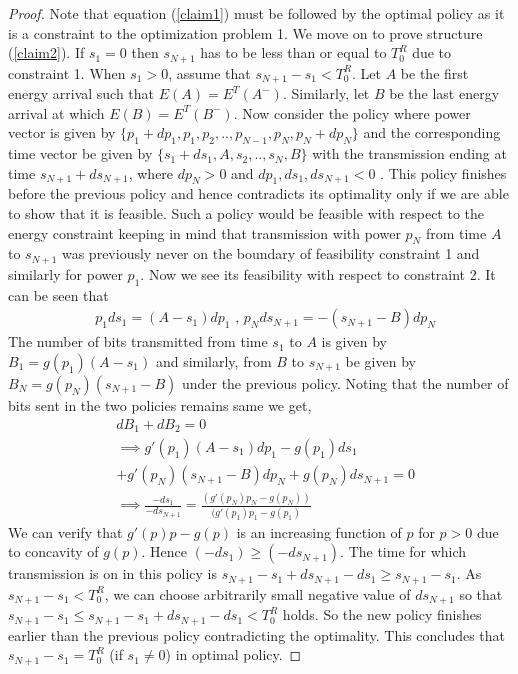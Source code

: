 \begin{proof}
Note that equation (\ref{claim1}) must be followed by the optimal policy as it is a constraint to the optimization problem 1. We move on to prove structure (\ref{claim2}). If $s_1=0$ then $s_{N+1}$ has to be less than or equal to $T^R_0$ due to constraint 1. When $s_1>0$, assume that $s_{N+1}-s_1<T^R_0$. Let $A$ be the first energy arrival such that $E(A)=E^T(A^-)$. Similarly, let $B$ be the last energy arrival at which $E(B)=E^T(B^-)$. Now consider the policy where power vector is given by $\{p_1+dp_1,p_1,p_2,..,p_{N-1},p_N,p_N+dp_N \}$ and the corresponding time vector be given by $\{s_1+ds_1,A,s_2,..,s_{N},B\}$ with the transmission ending at time $s_{N+1}+ds_{N+1}$, where $dp_N>0$ and  $dp_1,ds_1, ds_{N+1}<0$ . This policy finishes before the previous policy and hence contradicts its optimality only if we are able to show that it is feasible. Such a policy would be feasible with respect to the energy constraint keeping in mind that transmission with power $p_N$ from time $A$ to $s_{N+1}$ was previously never on the boundary of feasibility constraint 1 and similarly for power $p_1$. Now we see its feasibility with respect to constraint 2. It can be seen that
\begin{align}
&p_1ds_1=(A-s_1)dp_1\text{ , }p_Nds_{N+1}=-(s_{N+1}-B)dp_N
\end{align}
The number of bits transmitted from time $s_1$ to $A$ is given by $B_1=g(p_1)(A-s_1)$ and similarly, from $B$ to $s_{N+1}$ be given by $B_N=g(p_N)(s_{N+1}-B)$ under the previous policy. Noting that the number of bits sent in the two policies remains same we get,
\begin{align}
&\nonumber dB_1+dB_2=0
\\
&\nonumber\implies g'(p_1)(A-s_1)dp_1-g(p_1)ds_1
\\
&\nonumber +g'(p_N)(s_{N+1}-B)dp_N+g(p_N)ds_{N+1}=0
\\
&\nonumber\implies \frac{-ds_1}{-ds_{N+1}}=\frac{(g'(p_N)p_N-g(p_N))}{(g'(p_1)p_1-g(p_1)}
\end{align}
We can verify that $g'(p)p-g(p)$ is an increasing function of $p$ for $p>0$ due to concavity of $g(p)$. Hence $(-ds_1)\ge (-ds_{N+1})$. The time for which transmission is on in this policy is $s_{N+1}-s_1+ds_{N+1}-ds_1\ge s_{N+1}-s_1$. As $s_{N+1}-s_1<T^R_0$, we can choose arbitrarily small negative value of $ds_{N+1}$ so that $s_{N+1}-s_1\le s_{N+1}-s_1+ds_{N+1}-ds_1<T^R_0$ holds. So the new policy finishes earlier than the previous policy contradicting the optimality. This concludes that $s_{N+1}-s_1=T^R_0$ (if $s_1\neq 0$) in optimal policy.


\end{proof}
